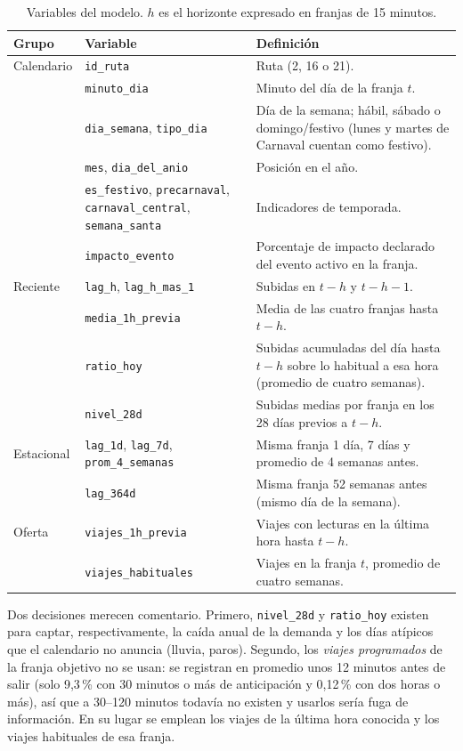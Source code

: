 \documentclass[11pt,a4paper]{article}
\begin{document}
\begin{table}[H]
  \centering
  \caption{Variables del modelo. $h$ es el horizonte expresado en franjas de 15 minutos.}
  \label{tab:vars}
  \small
  \renewcommand{\arraystretch}{1.15}
  \begin{tabular}{p{2.3cm} p{3.6cm} p{8.2cm}}
    \toprule
    Grupo & Variable & Definición \\
    \midrule
    Calendario & \texttt{id\_ruta} & Ruta (2, 16 o 21). \\
     & \texttt{minuto\_dia} & Minuto del día de la franja $t$. \\
     & \texttt{dia\_semana}, \texttt{tipo\_dia} & Día de la semana; hábil, sábado o domingo/festivo (lunes y martes de Carnaval cuentan como festivo). \\
     & \texttt{mes}, \texttt{dia\_del\_anio} & Posición en el año. \\
     & \texttt{es\_festivo}, \texttt{precarnaval}, \texttt{carnaval\_central}, \texttt{semana\_santa} & Indicadores de temporada. \\
     & \texttt{impacto\_evento} & Porcentaje de impacto declarado del evento activo en la franja. \\
    \addlinespace
    Reciente & \texttt{lag\_h}, \texttt{lag\_h\_mas\_1} & Subidas en $t-h$ y $t-h-1$. \\
     & \texttt{media\_1h\_previa} & Media de las cuatro franjas hasta $t-h$. \\
     & \texttt{ratio\_hoy} & Subidas acumuladas del día hasta $t-h$ sobre lo habitual a esa hora (promedio de cuatro semanas). \\
     & \texttt{nivel\_28d} & Subidas medias por franja en los 28 días previos a $t-h$. \\
    \addlinespace
    Estacional & \texttt{lag\_1d}, \texttt{lag\_7d}, \texttt{prom\_4\_semanas} & Misma franja 1 día, 7 días y promedio de 4 semanas antes. \\
     & \texttt{lag\_364d} & Misma franja 52 semanas antes (mismo día de la semana). \\
    \addlinespace
    Oferta & \texttt{viajes\_1h\_previa} & Viajes con lecturas en la última hora hasta $t-h$. \\
     & \texttt{viajes\_habituales} & Viajes en la franja $t$, promedio de cuatro semanas. \\
    \bottomrule
  \end{tabular}
\end{table}

Dos decisiones merecen comentario. Primero, \texttt{nivel\_28d} y \texttt{ratio\_hoy} existen para captar, respectivamente, la caída anual de la demanda y los días atípicos que el calendario no anuncia (lluvia, paros). Segundo, los \emph{viajes programados} de la franja objetivo no se usan: se registran en promedio unos 12 minutos antes de salir (solo 9,3\,\% con 30 minutos o más de anticipación y 0,12\,\% con dos horas o más), así que a 30--120 minutos todavía no existen y usarlos sería fuga de información. En su lugar se emplean los viajes de la última hora conocida y los viajes habituales de esa franja.
\end{document}
